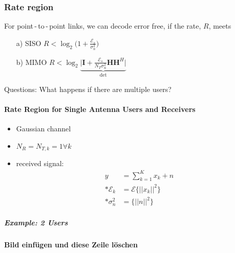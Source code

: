 \documentclass[a4paper, 10pt]{article}
\begin{document}
\subsubsection{Rate region}
For point\,-\,to\,-\,point links, we can decode error free, if the rate, $R$, meets
  \begin{itemize}
     \item[a)] SISO	$R < \log_2\bigl(1+\frac{\mathcal{E}_s}{\sigma_n^2}	\bigr) $
     \item[b)] MIMO $R < \log_2\underbrace{\bigl|\mathbf{I} + \frac{\mathcal{E}_s}{N_T\sigma_n^2} \mathbf{HH}^H\bigr|}_{\text{det}} $
	\end{itemize} 
Questions: What happens if there are multiple users?
\paragraph{Rate Region for Single Antenna Users and Receivers}
\begin{itemize}
	\item Gaussian channel
	\item $N_R = N_{T,k} = 1 \forall	k $
	\item received signal: 
	\begin{align*}
		y &= \sum\limits_{k = 1}^{K}x_k + n\\ * \mathcal{E}_k &= \mathcal{E}\bigl\{||x_k||^2\bigr\} \\ *\sigma_n^2 &= \bigl\{||n||^2\bigr\}
	\end{align*}
\end{itemize}
\subparagraph*{Example: 2 Users}
\textbf{Bild einf\"ugen und diese Zeile l\"oschen}
\end{document}
